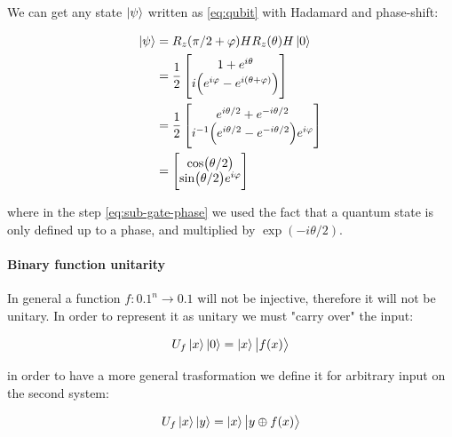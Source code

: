 \documentclass[main.tex]{subfiles}
\begin{document}
\begin{bluebox}
We can get any state \(\ket{\psi }\) written as \eqref{eq:qubit} with Hadamard and phase-shift:

\begin{subequations}
\begin{align}
  \ket{\psi }  &= R_z(\pi/2 + \varphi) H R_z(\theta) H\ket{0}  \\
  &= \frac{1}{2} \begin{bmatrix}
    1 + e^{i \theta} \\
     i  \qty(e^{i \varphi}  - e^{i (\theta + \varphi)})
  \end{bmatrix}  \\
  &= \label{eq:sub-gate-phase}
  \frac{1}{2} \begin{bmatrix}
    e^{i \theta /2} + e^{-i \theta /2} \\
    i^{-1} \qty(e^{i \theta/2} - e^{-i \theta/2}) e^{i \varphi}
\end{bmatrix}  \\
 &= \begin{bmatrix}
 \cos(\theta/2)  \\
 \sin(\theta/2) e^{i \varphi}
\end{bmatrix}
\end{align}
\end{subequations}

where in the step \eqref{eq:sub-gate-phase} we used the fact that a quantum state is only defined up to a phase, and multiplied by \(\exp(-i \theta/2) \).
\end{bluebox}


\paragraph{Binary function unitarity}

In general a function \(f: \qty{0,1}^n \rightarrow \qty{0,1}\) will not be injective, therefore it will not be unitary. In order to represent it as unitary we must "carry over" the input:

\begin{equation}
    U_f \ket{x} \ket{0} = \ket{x} \ket{f(x)}
\end{equation}

in order to have a more general trasformation we define it for arbitrary input on the second system:

\begin{equation}
    U_f \ket{x} \ket{y} = \ket{x} \ket{y \oplus f(x)}
\end{equation}
\end{document}
